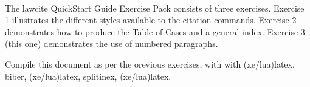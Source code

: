 %
%






\usepackage[
				bookmarks,
            colorlinks=true,        
            allcolors = black,  
            citecolor=blue,        
            pageanchor=true,
            plainpages=false,
            hyperindex=false, 
]{hyperref}


\newcommand\illus[2]{\bigskip\noindent\fbox{#1}\\#2}



\maketitle


\setindexhyperlinks
\let\xoldtwocolumn\twocolumn
\iftoggle{printlegtoc}{%
\let\oldtwocolumn\twocolumn
\renewcommand{\twocolumn}[1][]{#1}
\let\oldclearpage\clearpage
\renewcommand\clearpage{\relax}
\extendtheindex{}{\useindexpreamble}{}{}
\printindex[cases]
\printindex[legislation]
\iftoggle{printregulations}{\printindex[regulations]}{}
\renewcommand{\twocolumn}[1][]{\oldtwocolumn}
\renewcommand\clearpage{\oldclearpage}
}{}
\bigskip
\hfill{}\hfill\ %
\bigskip

\p The lawcite QuickStart Guide Exercise Pack consists of three exercises. 
Exercise 1 illustrates the different styles available to the citation commands. Exercise 2 demonstrates how to produce the Table of Cases and a general index. Exercise 3 (this one) demonstrates the use of numbered paragraphs.

\p Compile this document as per the orevious exercises, with with (xe/lua)latex, biber, (xe/lua)latex, splitinex, (xe/lua)latex.

